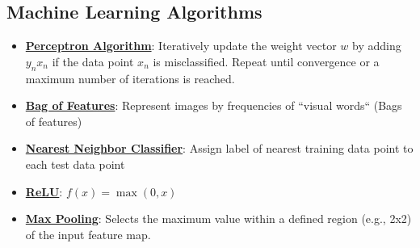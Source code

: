 \documentclass{article}%
\begin{document}
\subsection{Machine Learning Algorithms}%
\label{subsec:MachineLearningAlgorithms}%
\begin{itemize}[leftmargin=*]%
\item \href{https://purdue.brightspace.com/d2l/common/assets/pdfjs-d2l-dist/1.0.14-legacy/web/viewer.html?file=\%2Fcontent\%2Fenforced\%2F1095467-wl.202510.CS.24300.001\%2F05L2-ML Basics.pdf\%3Fou\%3D1095467\&lang=en-us\&container=d2l-fileviewer-rendered-pdf\&fullscreen=d2l-fileviewer-rendered-pdf-dialog\&height=667#page=30}{\textbf{Perceptron Algorithm}}: Iteratively update the weight vector $w$ by adding $y_nx_n$ if the data point $x_n$ is misclassified. Repeat until convergence or a maximum number of iterations is reached.%
\item \href{https://purdue.brightspace.com/d2l/common/assets/pdfjs-d2l-dist/1.0.14-legacy/web/viewer.html?file=\%2Fcontent\%2Fenforced\%2F1095467-wl.202510.CS.24300.001\%2F07L2-Vision.pdf\%3Fou\%3D1095467\&lang=en-us\&container=d2l-fileviewer-rendered-pdf\&fullscreen=d2l-fileviewer-rendered-pdf-dialog\&height=667#page=16}{\textbf{Bag of Features}}: Represent images by frequencies of ``visual words`` (Bags of features)%
\item \href{https://purdue.brightspace.com/d2l/common/assets/pdfjs-d2l-dist/1.0.14-legacy/web/viewer.html?file=\%2Fcontent\%2Fenforced\%2F1095467-wl.202510.CS.24300.001\%2F07L2-Vision.pdf\%3Fou\%3D1095467\&lang=en-us\&container=d2l-fileviewer-rendered-pdf\&fullscreen=d2l-fileviewer-rendered-pdf-dialog\&height=667#page=30}{\textbf{Nearest Neighbor Classifier}}: Assign label of nearest training data point to each test data point%
\item \href{https://purdue.brightspace.com/d2l/common/assets/pdfjs-d2l-dist/1.0.14-legacy/web/viewer.html?file=\%2Fcontent\%2Fenforced\%2F1095467-wl.202510.CS.24300.001\%2F09L1-cnn.pdf\%3Fou\%3D1095467\&lang=en-us\&container=d2l-fileviewer-rendered-pdf\&fullscreen=d2l-fileviewer-rendered-pdf-dialog\&height=667#page=13}{\textbf{ReLU}}: $f(x) = \max(0, x)$%
\item \href{https://purdue.brightspace.com/d2l/common/assets/pdfjs-d2l-dist/1.0.14-legacy/web/viewer.html?file=\%2Fcontent\%2Fenforced\%2F1095467-wl.202510.CS.24300.001\%2F09L1-cnn.pdf\%3Fou\%3D1095467\&lang=en-us\&container=d2l-fileviewer-rendered-pdf\&fullscreen=d2l-fileviewer-rendered-pdf-dialog\&height=667#page=15}{\textbf{Max Pooling}}: Selects the maximum value within a defined region (e.g., 2x2) of the input feature map.%

\end{itemize}
\end{document}
